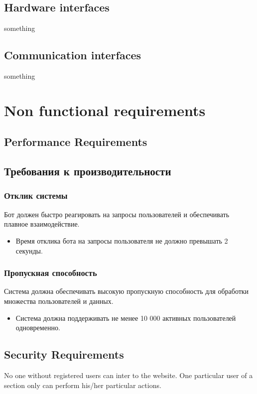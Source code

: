 \documentclass{scrreprt}
\begin{document}
\section{Hardware interfaces}
something

\section{Communication interfaces}
something

\chapter{Non functional requirements}

\section{Performance Requirements}

\section{Требования к производительности}

\subsection{Отклик системы}
Бот должен быстро реагировать на запросы пользователей и обеспечивать плавное взаимодействие.
\begin{itemize}
    \item Время отклика бота на запросы пользователя не должно превышать 2 секунды.
\end{itemize}

\subsection{Пропускная способность}
Система должна обеспечивать высокую пропускную способность для обработки множества пользователей и данных.
\begin{itemize}
    \item Система должна поддерживать не менее 10 000 активных пользователей одновременно.
\end{itemize}

\section{Security Requirements}
No one without registered users can inter to the website. One particular user of a section only can perform his/her particular actions.
\end{document}
